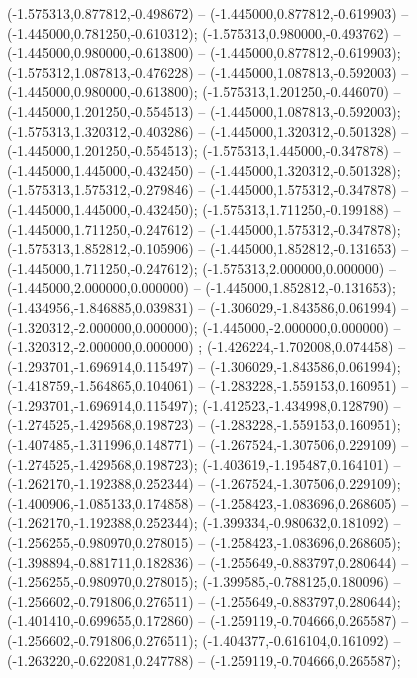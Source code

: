  (-1.575313,0.877812,-0.498672) -- (-1.445000,0.877812,-0.619903) -- (-1.445000,0.781250,-0.610312);
 (-1.575313,0.980000,-0.493762) -- (-1.445000,0.980000,-0.613800) -- (-1.445000,0.877812,-0.619903);
 (-1.575312,1.087813,-0.476228) -- (-1.445000,1.087813,-0.592003) -- (-1.445000,0.980000,-0.613800);
 (-1.575313,1.201250,-0.446070) -- (-1.445000,1.201250,-0.554513) -- (-1.445000,1.087813,-0.592003);
 (-1.575313,1.320312,-0.403286) -- (-1.445000,1.320312,-0.501328) -- (-1.445000,1.201250,-0.554513);
 (-1.575313,1.445000,-0.347878) -- (-1.445000,1.445000,-0.432450) -- (-1.445000,1.320312,-0.501328);
 (-1.575313,1.575312,-0.279846) -- (-1.445000,1.575312,-0.347878) -- (-1.445000,1.445000,-0.432450);
 (-1.575313,1.711250,-0.199188) -- (-1.445000,1.711250,-0.247612) -- (-1.445000,1.575312,-0.347878);
 (-1.575313,1.852812,-0.105906) -- (-1.445000,1.852812,-0.131653) -- (-1.445000,1.711250,-0.247612);
 (-1.575313,2.000000,0.000000) -- (-1.445000,2.000000,0.000000) -- (-1.445000,1.852812,-0.131653);
 (-1.434956,-1.846885,0.039831) -- (-1.306029,-1.843586,0.061994) -- (-1.320312,-2.000000,0.000000);
 (-1.445000,-2.000000,0.000000) -- (-1.320312,-2.000000,0.000000) ;
 (-1.426224,-1.702008,0.074458) -- (-1.293701,-1.696914,0.115497) -- (-1.306029,-1.843586,0.061994);
 (-1.418759,-1.564865,0.104061) -- (-1.283228,-1.559153,0.160951) -- (-1.293701,-1.696914,0.115497);
 (-1.412523,-1.434998,0.128790) -- (-1.274525,-1.429568,0.198723) -- (-1.283228,-1.559153,0.160951);
 (-1.407485,-1.311996,0.148771) -- (-1.267524,-1.307506,0.229109) -- (-1.274525,-1.429568,0.198723);
 (-1.403619,-1.195487,0.164101) -- (-1.262170,-1.192388,0.252344) -- (-1.267524,-1.307506,0.229109);
 (-1.400906,-1.085133,0.174858) -- (-1.258423,-1.083696,0.268605) -- (-1.262170,-1.192388,0.252344);
 (-1.399334,-0.980632,0.181092) -- (-1.256255,-0.980970,0.278015) -- (-1.258423,-1.083696,0.268605);
 (-1.398894,-0.881711,0.182836) -- (-1.255649,-0.883797,0.280644) -- (-1.256255,-0.980970,0.278015);
 (-1.399585,-0.788125,0.180096) -- (-1.256602,-0.791806,0.276511) -- (-1.255649,-0.883797,0.280644);
 (-1.401410,-0.699655,0.172860) -- (-1.259119,-0.704666,0.265587) -- (-1.256602,-0.791806,0.276511);
 (-1.404377,-0.616104,0.161092) -- (-1.263220,-0.622081,0.247788) -- (-1.259119,-0.704666,0.265587);
